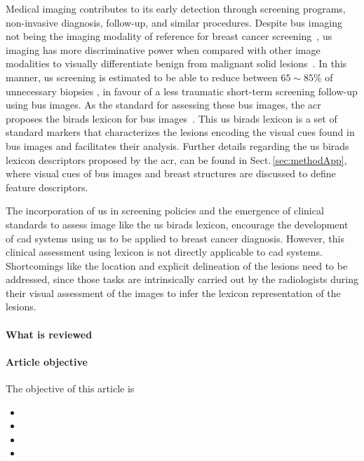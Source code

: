 Medical imaging contributes to its early detection through screening programs, non-invasive diagnosis, follow-up, and similar procedures.
Despite \ac{bus} imaging not being the imaging modality of reference for breast cancer screening~\cite{smith2003american}, \ac{us} imaging has more discriminative power when compared with other image modalities to visually differentiate benign from malignant solid lesions~\cite{Stavros:1995p12392}.
In this manner, \ac{us} screening is estimated to be able to reduce
between $65\sim85\%$ of unnecessary biopsies%
, in favour of a less traumatic short-term screening follow-up using \ac{bus} images.
As the standard for assessing these \ac{bus} images, the \ac{acr} proposes the \ac{birads} lexicon for \ac{bus} images~\cite{biradsus}.
This \ac{us} \ac{birads} lexicon is a set of standard markers that characterizes the lesions encoding the visual cues found in \ac{bus} images and facilitates their analysis.
Further details regarding the \ac{us} \ac{birads} lexicon descriptors proposed by the \ac{acr}, can be found in Sect.\,\ref{sec:methodApp}, where visual cues of \ac{bus} images and breast structures are discussed to define feature descriptors.

The incorporation of \ac{us} in screening policies and the emergence of clinical standards to assess image like the \ac{us} \ac{birads} lexicon, encourage the development of \ac{cad} systems using \ac{us} to be applied to breast cancer diagnosis.
However, this clinical assessment using lexicon is not directly applicable to \ac{cad} systems.
Shortcomings like the location and explicit delineation of the lesions need to be addressed, since those tasks are intrinsically carried out by the radiologists during their visual assessment of the images to infer the lexicon representation of the lesions.

\paragraph{What is reviewed}
\label{sec:intro:what_is_reviewed}

\paragraph{Article objective}
\label{sec:intro:article_objective}

The objective of this article is
\begin{itemize}
  \item {}
  \item {}
  \item {}
  \item {}
\end{itemize}

